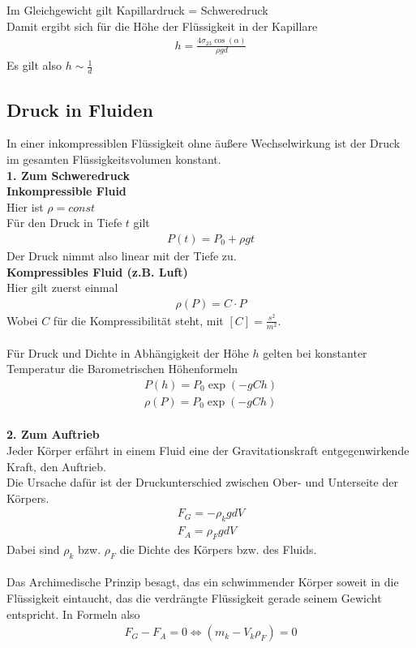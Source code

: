 \documentclass[a4paper,12pt]{report}
\begin{document}
Im Gleichgewicht gilt Kapillardruck = Schweredruck \\
Damit ergibt sich für die Höhe der Flüssigkeit in der Kapillare 
\begin{align}
h = \frac{4\sigma_{23}\cos(\alpha)}{\rho gd}
\end{align}
Es gilt also $h \sim \frac{1}{d}$

\subsection{Druck in Fluiden}
In einer inkompressiblen Flüssigkeit ohne äußere Wechselwirkung ist der Druck im gesamten Flüssigkeitsvolumen konstant. \\

\textbf{1. Zum Schweredruck} \\

\textbf{Inkompressible Fluid} \\
Hier ist $\rho = const $  \\
Für den Druck in Tiefe $t$ gilt 
\begin{align}
P(t) = P_0 + \rho gt
\end{align}
Der Druck nimmt also linear mit der Tiefe zu. \\

\textbf{Kompressibles Fluid (z.B. Luft)} \\
Hier gilt zuerst einmal 
\begin{align}
\rho(P) = C \cdot P
\end{align}
Wobei $C$ für die Kompressibilität steht, mit $[C] = \frac{s^2}{m^2}$.\\
\\ Für Druck und Dichte in Abhängigkeit der Höhe $h$ gelten bei konstanter Temperatur die Barometrischen Höhenformeln 
\begin{align}
P(h) = P_0\exp(-gCh) \\
\rho(P) = P_0\exp(-gCh)
\end{align}
\\
\textbf{2. Zum Auftrieb} \\
Jeder Körper erfährt in einem Fluid eine der Gravitationskraft entgegenwirkende Kraft, den Auftrieb. \\
Die Ursache dafür ist der Druckunterschied zwischen Ober- und Unterseite der Körpers. \\
\begin{align}
F_G = -\rho_kgdV \\
F_A = \rho_FgdV
\end{align}
Dabei sind $\rho_k$ bzw. $\rho_F$ die Dichte des Körpers bzw. des Fluids. \\ \\
Das Archimedische Prinzip besagt, das ein schwimmender Körper soweit in die Flüssigkeit eintaucht, das die verdrängte Flüssigkeit gerade seinem Gewicht entspricht. In Formeln also 
\begin{align}
F_G - F_A = 0 
 \Leftrightarrow  (m_k - V_k\rho_F) = 0
\end{align}
\end{document}

